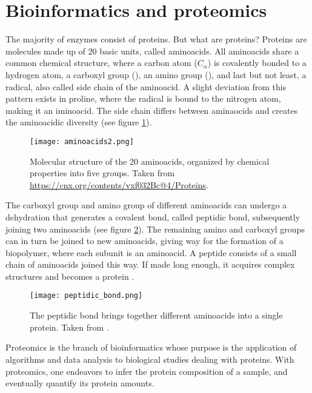 \section{Bioinformatics and proteomics}

The majority of enzymes consist of proteins. But what are proteins? Proteins are molecules made up of 20 basic units, called aminoacids. All aminoacids share a common chemical structure, where a carbon atom ($C_\alpha$) is covalently bonded to a hydrogen atom, a carboxyl group (), an amino group (), and last but not least, a radical, also called side chain of the aminoacid. A slight deviation from this pattern exists in proline, where the radical is bound to the nitrogen atom, making it an iminoacid. The side chain differs between aminaocids and creates the aminoacidic diversity   (see figure \ref{fig:aminoacids}).

\begin{figure}
  \centering
  \texttt{[image: aminoacids2.png]}
  \caption[The 20 aminoacids]{Molecular structure of the 20 aminoacids, organized by chemical properties into five groups. Taken from \href{https://cnx.org/contents/vxf032Bc@4/Proteins}{https://cnx.org/contents/vxf032Bc@4/Proteins}.}
  \label{fig:aminoacids}
\end{figure}

The carboxyl group and amino group of different aminoacids can undergo a dehydration that generates a covalent bond, called peptidic bond, subsequently joining two aminoacids (see figure \ref{fig:peptidic_bond}). The remaining amino and carboxyl groups can in turn be joined to new aminoacids, giving way for the formation of a biopolymer, where each subunit is an aminoacid. A peptide consists of a small chain of aminoacids joined this way. If made long enough, it acquires complex structures and becomes a protein \cite{Nelson2008}.

\begin{figure}
  \centering
  \texttt{[image: peptidic\_bond.png]}
  \caption[The peptidic bond]{The peptidic bond brings together different aminoacids into a single protein. Taken from \cite{Nelson2008}.}
  \label{fig:peptidic_bond}
\end{figure}


Proteomics is the branch of bioinformatics whose purpose is the application of algorithms and data analysis to biological studies dealing with proteins. With proteomics, one endeavors to infer the protein composition of a sample, and eventually quantify its protein amounts. 

